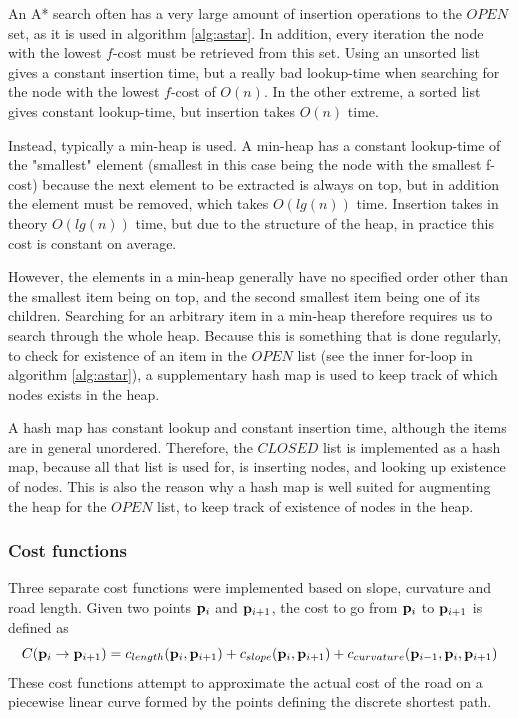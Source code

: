 An A* search often has a very large amount of insertion operations to the $OPEN$ set, as it is used in algorithm \ref{alg:astar}. In addition, every iteration the node with the lowest $f$-cost must be retrieved from this set. Using an unsorted list gives a constant insertion time, but a really bad lookup-time when searching for the node with the lowest $f$-cost of $O(n)$. In the other extreme, a sorted list gives constant lookup-time, but insertion takes $O(n)$ time. 

Instead, typically a min-heap is used. A min-heap has a constant lookup-time of the "smallest" element (smallest in this case being the node with the smallest f-cost) because the next element to be extracted is always on top, but in addition the element must be removed, which takes $O(lg(n))$ time. Insertion takes in theory $O(lg(n))$ time, but due to the structure of the heap, in practice this cost is constant on average. 

However, the elements in a min-heap generally have no specified order other than the smallest item being on top, and the second smallest item being one of its children. Searching for an arbitrary item in a min-heap therefore requires us to search through the whole heap. Because this is something that is done regularly, to check for existence of an item in the $OPEN$ list (see the inner for-loop in algorithm \ref{alg:astar}), a supplementary hash map is used to keep track of which nodes exists in the heap. 

A hash map has constant lookup and constant insertion time, although the items are in general unordered. Therefore, the $CLOSED$ list is implemented as a hash map, because all that list is used for, is inserting nodes, and looking up existence of nodes. This is also the reason why a hash map is well suited for augmenting the heap for the $OPEN$ list, to keep track of existence of nodes in the heap.

\subsubsection{Cost functions}
Three separate cost functions were implemented based on slope, curvature and road length. Given two points ${\mathbf p}_i$ and ${\mathbf p}_{i+1}$, the cost to go from ${\mathbf p}_i$ to ${\mathbf p}_{i+1}$ is defined as 
\begin{equation}
C({\mathbf p}_i \to {\mathbf p}_{i+1}) = c_{length}({\mathbf p}_i, {\mathbf p}_{i+1}) + c_{slope}({\mathbf p}_i, {\mathbf p}_{i+1}) + c_{curvature}({\mathbf p}_{i-1}, {\mathbf p}_i, {\mathbf p}_{i+1})
\label{eq:cost_function_overview}
\end{equation}
These cost functions attempt to approximate the actual cost of the road on a piecewise linear curve formed by the points defining the discrete shortest path. 

